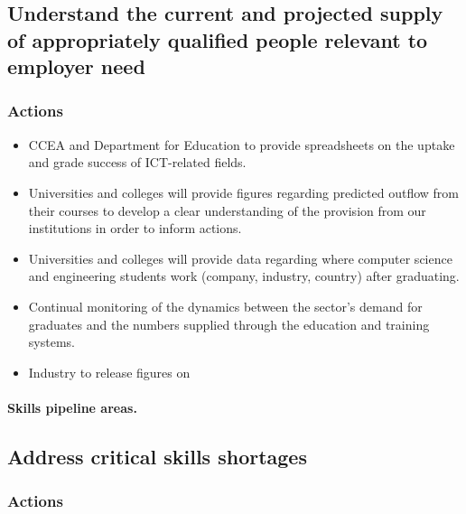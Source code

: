 \subsection{Understand the current and projected supply of appropriately qualified people relevant to employer need}

\subsubsection{Actions}

\begin{itemize}
    \item CCEA and Department for Education to provide spreadsheets on the uptake and grade success of ICT-related fields. 
    \item Universities and colleges will provide figures regarding predicted outflow from their courses to develop a clear understanding of the provision from our institutions in order to inform actions.
    \item Universities and colleges will provide data regarding where computer science and engineering students work (company, industry, country) after graduating.
    \item Continual monitoring of the dynamics between the sector’s demand for graduates and the numbers supplied through the education and training systems.
    \item Industry to release figures on 
\end{itemize}

\paragraph{Skills pipeline areas.} 

\subsection{Address critical skills shortages}

\subsubsection{Actions}

